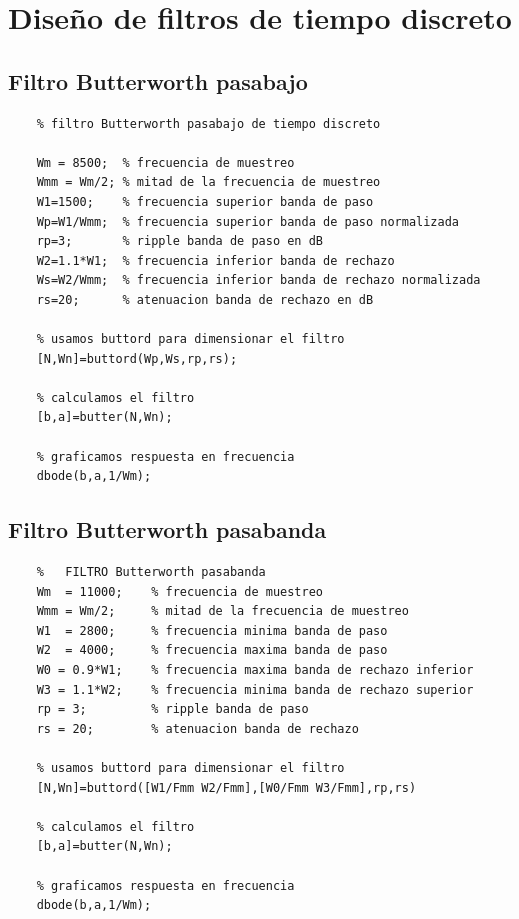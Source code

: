 \section{Dise\~{n}o de filtros de tiempo discreto}

\subsection{Filtro Butterworth pasabajo}

\begin{verbatim}
	% filtro Butterworth pasabajo de tiempo discreto
	
	Wm = 8500;  % frecuencia de muestreo
	Wmm = Wm/2; % mitad de la frecuencia de muestreo
	W1=1500;    % frecuencia superior banda de paso                     
	Wp=W1/Wmm;  % frecuencia superior banda de paso normalizada 
	rp=3;       % ripple banda de paso en dB
	W2=1.1*W1;  % frecuencia inferior banda de rechazo 
	Ws=W2/Wmm;  % frecuencia inferior banda de rechazo normalizada
	rs=20;      % atenuacion banda de rechazo en dB 
	
	% usamos buttord para dimensionar el filtro
	[N,Wn]=buttord(Wp,Ws,rp,rs);
	
	% calculamos el filtro
	[b,a]=butter(N,Wn);
	
	% graficamos respuesta en frecuencia
	dbode(b,a,1/Wm);
\end{verbatim}

\subsection{Filtro Butterworth pasabanda}

\begin{verbatim}
	%   FILTRO Butterworth pasabanda
	Wm  = 11000;    % frecuencia de muestreo
	Wmm = Wm/2;     % mitad de la frecuencia de muestreo
	W1  = 2800;     % frecuencia minima banda de paso
	W2  = 4000;     % frecuencia maxima banda de paso
	W0 = 0.9*W1;    % frecuencia maxima banda de rechazo inferior
	W3 = 1.1*W2;    % frecuencia minima banda de rechazo superior
	rp = 3;         % ripple banda de paso
	rs = 20;        % atenuacion banda de rechazo
	
	% usamos buttord para dimensionar el filtro
	[N,Wn]=buttord([W1/Fmm W2/Fmm],[W0/Fmm W3/Fmm],rp,rs)
	
	% calculamos el filtro
	[b,a]=butter(N,Wn);
	
	% graficamos respuesta en frecuencia
	dbode(b,a,1/Wm);
\end{verbatim}

